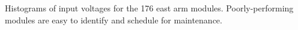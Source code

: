 Histograms of input voltages for the 176 east arm modules. Poorly-performing modules are easy to identify and schedule for maintenance.